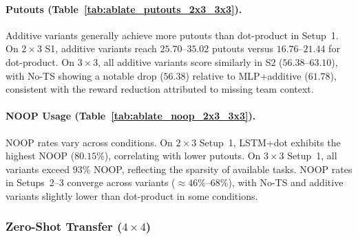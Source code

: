 \paragraph{Putouts (Table~\ref{tab:ablate_putouts_2x3_3x3}).}
Additive variants generally achieve more putouts than dot-product in Setup~1. On $2\times 3$ S1, additive variants reach $25.70$--$35.02$ putouts versus $16.76$--$21.44$ for dot-product. On $3\times 3$, all additive variants score similarly in S2 ($56.38$--$63.10$), with No-TS showing a notable drop ($56.38$) relative to MLP+additive ($61.78$), consistent with the reward reduction attributed to missing team context.

\paragraph{NOOP Usage (Table~\ref{tab:ablate_noop_2x3_3x3}).}
NOOP rates vary across conditions. On $2\times 3$ Setup~1, LSTM+dot exhibits the highest NOOP ($80.15\%$), correlating with lower putouts. On $3\times 3$ Setup~1, all variants exceed $93\%$ NOOP, reflecting the sparsity of available tasks. NOOP rates in Setups~2--3 converge across variants ($\approx 46\%$--$68\%$), with No-TS and additive variants slightly lower than dot-product in some conditions.

\subsubsection{Zero-Shot Transfer ($4\times 4$)}



